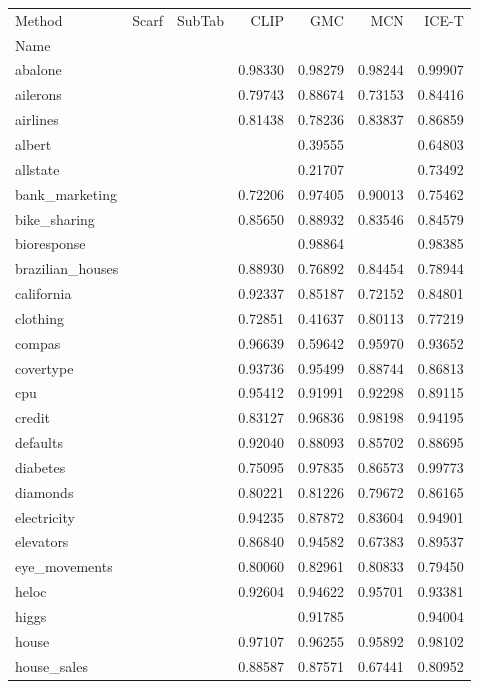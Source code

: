 \begin{tabular}{lrrrrrr}
\toprule
Method & Scarf & SubTab & CLIP & GMC & MCN & ICE-T \\
Name &  &  &  &  &  &  \\
\midrule
abalone &  &  & 0.98330 & 0.98279 & 0.98244 & 0.99907 \\
ailerons &  &  & 0.79743 & 0.88674 & 0.73153 & 0.84416 \\
airlines &  &  & 0.81438 & 0.78236 & 0.83837 & 0.86859 \\
albert &  &  &  & 0.39555 &  & 0.64803 \\
allstate &  &  &  & 0.21707 &  & 0.73492 \\
bank_marketing &  &  & 0.72206 & 0.97405 & 0.90013 & 0.75462 \\
bike_sharing &  &  & 0.85650 & 0.88932 & 0.83546 & 0.84579 \\
bioresponse &  &  &  & 0.98864 &  & 0.98385 \\
brazilian_houses &  &  & 0.88930 & 0.76892 & 0.84454 & 0.78944 \\
california &  &  & 0.92337 & 0.85187 & 0.72152 & 0.84801 \\
clothing &  &  & 0.72851 & 0.41637 & 0.80113 & 0.77219 \\
compas &  &  & 0.96639 & 0.59642 & 0.95970 & 0.93652 \\
covertype &  &  & 0.93736 & 0.95499 & 0.88744 & 0.86813 \\
cpu &  &  & 0.95412 & 0.91991 & 0.92298 & 0.89115 \\
credit &  &  & 0.83127 & 0.96836 & 0.98198 & 0.94195 \\
defaults &  &  & 0.92040 & 0.88093 & 0.85702 & 0.88695 \\
diabetes &  &  & 0.75095 & 0.97835 & 0.86573 & 0.99773 \\
diamonds &  &  & 0.80221 & 0.81226 & 0.79672 & 0.86165 \\
electricity &  &  & 0.94235 & 0.87872 & 0.83604 & 0.94901 \\
elevators &  &  & 0.86840 & 0.94582 & 0.67383 & 0.89537 \\
eye_movements &  &  & 0.80060 & 0.82961 & 0.80833 & 0.79450 \\
heloc &  &  & 0.92604 & 0.94622 & 0.95701 & 0.93381 \\
higgs &  &  &  & 0.91785 &  & 0.94004 \\
house &  &  & 0.97107 & 0.96255 & 0.95892 & 0.98102 \\
house_sales &  &  & 0.88587 & 0.87571 & 0.67441 & 0.80952 \\

\end{tabular}
